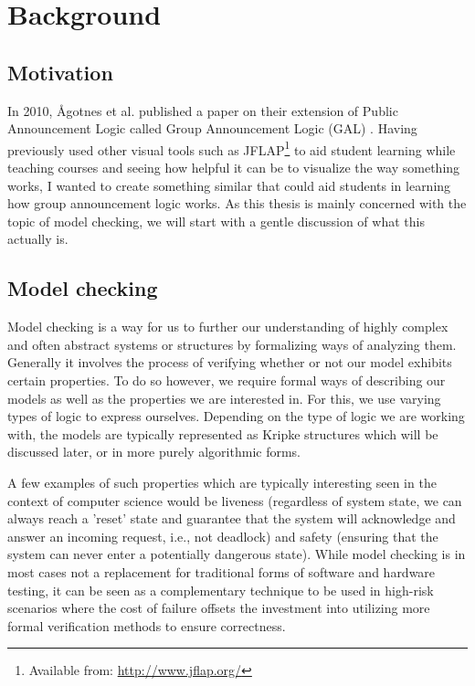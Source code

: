 \section{Background}\label{sec:back}

\subsection{Motivation}


In 2010, Ågotnes et al. published a paper on their extension of Public Announcement Logic called Group Announcement Logic (GAL) \cite{Agotnes2014}. Having previously used other visual tools such as JFLAP\footnote{Available from: \url{http://www.jflap.org/}} to aid student learning while teaching courses and seeing how helpful it can be to visualize the way something works, I wanted to create something similar that could aid students in learning how group announcement logic works. 
As this thesis is mainly concerned with the topic of model checking, we will start with a gentle discussion of what this actually is. 

\subsection{Model checking}

Model checking is a way for us to further our understanding of highly complex and often abstract systems or structures by formalizing ways of analyzing them. Generally it involves the process of verifying whether or not our model exhibits certain properties. To do so however, we require formal ways of describing our models as well as the properties we are interested in. For this, we use varying types of logic to express ourselves. Depending on the type of logic we are working with, the models are typically represented as Kripke structures which will be discussed later, or in more purely algorithmic forms.

A few examples of such properties which are typically interesting seen in the context of computer science would be liveness (regardless of system state, we can always reach a 'reset' state and guarantee that the system will acknowledge and answer an incoming request, i.e., not deadlock) and safety (ensuring that the system can never enter a potentially dangerous state). While model checking is in most cases not a replacement for traditional forms of software and hardware testing, it can be seen as a complementary technique to be used in high-risk scenarios where the cost of failure offsets the investment into utilizing more formal verification methods to ensure correctness.


